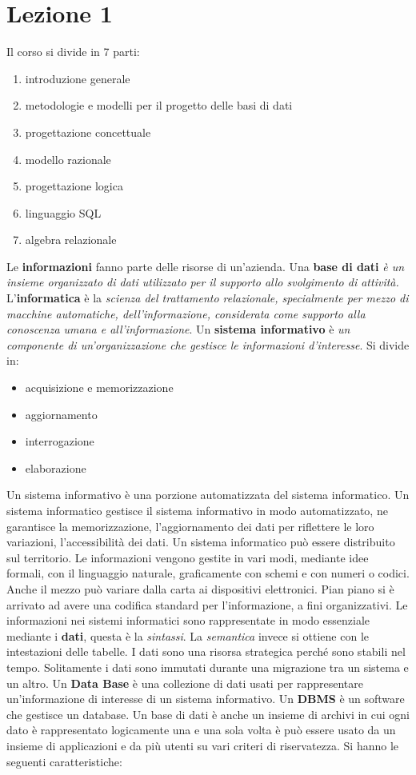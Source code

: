 \documentclass[a4paper,12pt, oneside]{book}
\begin{document}
\chapter{Lezione 1}
Il corso si divide in 7 parti:
\begin{enumerate}
\item introduzione generale
\item metodologie e modelli per il progetto delle basi di dati
\item progettazione concettuale
\item modello razionale
\item progettazione logica
\item linguaggio SQL
\item algebra relazionale
\end{enumerate}
Le \textbf{informazioni} fanno parte delle risorse di un'azienda. Una \textbf{base di dati} \textit{è un insieme organizzato di dati utilizzato per il supporto allo svolgimento di attività.} L'\textbf{informatica} è la \textit{scienza del trattamento relazionale, specialmente per mezzo di macchine automatiche, dell'informazione, considerata come supporto alla conoscenza umana e all'informazione}. Un \textbf{sistema informativo} è \textit{un componente di un'organizzazione che gestisce le informazioni d'interesse}. Si divide in:
\begin{itemize}
\item acquisizione e memorizzazione
\item aggiornamento
\item interrogazione
\item elaborazione
\end{itemize}
Un sistema informativo è una porzione automatizzata del sistema informatico. Un sistema informatico gestisce il sistema informativo in modo automatizzato, ne garantisce la memorizzazione, l'aggiornamento dei dati per riflettere le loro variazioni, l'accessibilità dei dati. Un sistema informatico può essere distribuito sul territorio. Le informazioni vengono gestite in vari modi, mediante idee formali, con il linguaggio naturale, graficamente con schemi e con numeri o codici. Anche il mezzo può variare dalla carta ai dispositivi elettronici. Pian piano si è arrivato ad avere una codifica standard per l'informazione, a fini organizzativi. Le informazioni nei sistemi informatici sono rappresentate in modo essenziale mediante i \textbf{dati}, questa è la \textit{sintassi}. La \textit{semantica} invece si ottiene con le intestazioni delle tabelle. I dati sono una risorsa strategica perché sono stabili nel tempo. Solitamente i dati sono immutati durante una migrazione tra un sistema e un altro. Un \textbf{Data Base} è una collezione di dati usati per rappresentare un'informazione di interesse di un sistema informativo. Un \textbf{DBMS} è un software che gestisce un database. Un base di dati è anche un insieme di archivi in cui ogni dato è rappresentato logicamente una e una sola volta è può essere usato da un insieme di applicazioni e da più utenti su vari criteri di riservatezza. Si hanno le seguenti caratteristiche:
\end{document}
